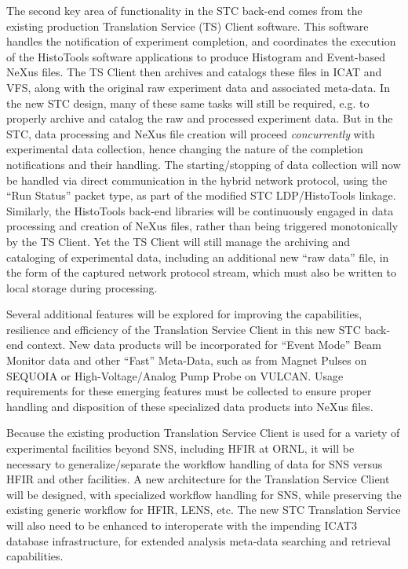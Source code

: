 The second key area of functionality in the STC back-end comes
from the existing production Translation Service (TS) Client software.
This software handles the notification of experiment completion,
and coordinates the execution of the HistoTools software applications
to produce Histogram and Event-based NeXus files.
The TS Client then archives and catalogs these files in ICAT and VFS,
along with the original raw experiment data and associated meta-data.
In the new STC design, many of these same tasks will still be required,
e.g. to properly archive and catalog the raw and processed experiment data.
But in the STC, data processing and NeXus file creation will proceed
{\em concurrently} with experimental data collection,
hence changing the nature of the completion notifications
and their handling.
The starting/stopping of data collection will now be handled
via direct communication in the hybrid network protocol,
using the ``Run Status'' packet type,
as part of the modified STC LDP/HistoTools linkage.
Similarly, the HistoTools back-end libraries will be continuously engaged
in data processing and creation of NeXus files,
rather than being triggered monotonically by the TS Client.
Yet the TS Client will still manage
the archiving and cataloging of experimental data,
including an additional new ``raw data'' file,
in the form of the captured network protocol stream,
which must also be written to local storage during processing.

Several additional features will be explored for improving the
capabilities, resilience and efficiency of the Translation Service Client
in this new STC back-end context.
New data products will be incorporated for ``Event Mode'' Beam Monitor data
and other ``Fast'' Meta-Data,
such as from Magnet Pulses on SEQUOIA
or High-Voltage/Analog Pump Probe on VULCAN.
Usage requirements for these emerging features
must be collected to ensure proper handling
and disposition of these specialized data products into NeXus files.

Because the existing production Translation Service Client
is used for a variety of experimental facilities beyond SNS,
including HFIR at ORNL,
it will be necessary to generalize/separate the workflow handling
of data for SNS versus HFIR and other facilities.
A new architecture for the Translation Service Client
will be designed, with specialized workflow handling for SNS,
while preserving the existing generic workflow for HFIR, LENS, etc.
The new STC Translation Service will also need to be enhanced
to interoperate with the impending ICAT3 database infrastructure,
for extended analysis meta-data searching and retrieval capabilities.

